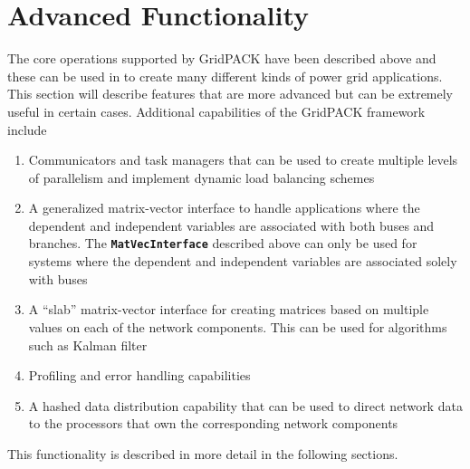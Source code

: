\chapter{Advanced Functionality}

The core operations supported by GridPACK have been described above and these can be used in to create many different kinds of power grid applications. This section will describe features that are more advanced but can be extremely useful in certain cases. Additional capabilities of the GridPACK framework include
\begin{enumerate}
\item  Communicators and task managers that can be used to create multiple levels of parallelism and implement dynamic load balancing schemes

\item  A generalized matrix-vector interface to handle applications where the dependent and independent variables are associated with both buses and branches. The \texttt{\textbf{MatVecInterface}} described above can only be used for systems where the dependent and independent variables are associated solely with buses

\item  A ``slab'' matrix-vector interface for creating matrices based on multiple values on each of the network components. This can be used for algorithms such as Kalman filter

\item  Profiling and error handling capabilities

\item  A hashed data distribution capability that can be used to direct network data to the processors that own the corresponding network components
\end{enumerate}

This functionality is described in more detail in the following sections.
